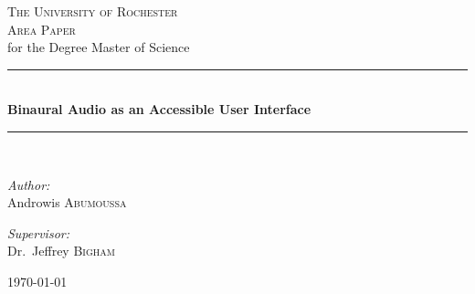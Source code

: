 \documentclass[12pt]{report}
\newcommand{\HRule}{\rule{\linewidth}{0.5mm}}
\begin{document}
\begin{titlepage}
\begin{center}

\textsc{\LARGE The University of Rochester}
\\[5.5cm]

\textsc{\Large Area Paper}\\
for the Degree Master of Science
\\[0.5cm]

\HRule \\[0.4cm]
{ \large \bfseries Binaural Audio as an Accessible User Interface }\\[0.4cm]

\HRule \\[0.5cm]

\begin{minipage}{0.4\textwidth}
\begin{flushleft} \large
\emph{Author:}\\
Androwis \textsc{Abumoussa}
\end{flushleft}
\end{minipage}
\begin{minipage}{0.4\textwidth}
\begin{flushright} \large
\emph{Supervisor:} \\
Dr.~Jeffrey \textsc{Bigham}
\end{flushright}
\end{minipage}

\vfill

{\large \today}

\end{center}
\end{titlepage}



\renewcommand{\thepage }{\roman{page}}                         \tableofcontents



\newpage \thispagestyle{empty} \quad
\end{document}
